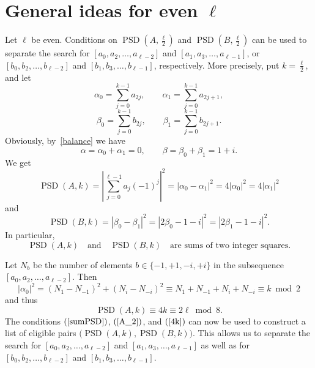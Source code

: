 \documentclass{article}
\theoremstyle{definition}
\newcommand{\PSD}{\operatorname{PSD}}
\begin{document}
\section{General ideas for even \texorpdfstring{$\ell$}{l}}
\label{general}
Let $\ell$ be even. 
Conditions on $\PSD\left(A,\frac{\ell}{2}\right)$ and $\PSD\left(B,\frac{\ell}{2}\right)$ can be used to separate the search for $[a_0,a_2,\ldots,a_{\ell-2}]$ and $[a_1,a_3,\ldots,a_{\ell-1}]$, or $[b_0,b_2,\ldots,b_{\ell-2}]$ and $[b_1,b_3,\ldots,b_{\ell-1}]$, respectively. More precisely, put $k=\frac{\ell}{2}$, and let
\begin{equation}\label{evenodd1}
\alpha_0=\sum_{j=0}^{k-1} a_{2j},\qquad \alpha_1=\sum_{j=0}^{k-1}a_{2j+1},
\end{equation}
\begin{equation}\label{evenodd2}
\beta_0=\sum_{j=0}^{k-1} b_{2j},\qquad \beta_1=\sum_{j=0}^{k-1}b_{2j+1}.
\end{equation}
Obviously, by~\eqref{balance} we have
$$\alpha=\alpha_0+\alpha_1=0,\qquad \beta=\beta_0+\beta_1=1+i.$$
We get
$$%
\PSD(A,k)=\left|\sum_{j=0}^{\ell-1}a_j (-1)^j\right|^2=|\alpha_0-\alpha_1|^2=4|\alpha_0|^2=4|\alpha_1|^2$$
and
$$%
\PSD(B,k)=|\beta_0-\beta_1|^2=|2\beta_0-1-i|^2=|2\beta_1-1-i|^2.$$
In particular, 
\begin{equation}\label{A_2}
 \PSD(A,k) \quad\mbox{and}\quad  \PSD(B,k)\quad \mbox{are sums of two integer squares}. 
\end{equation}

Let $N_b$ be the number of elements $b\in \{-1,+1,-i,+i\}$ in the subsequence $[a_0,a_2,\ldots,a_{\ell-2}]$. 
Then
\begin{equation}\label{alpha0iskmod2}
  |\alpha_0|^2=(N_1-N_{-1})^2+(N_i-N_{-i})^2\equiv N_1+N_{-1}+N_i+N_{-i}\equiv k \bmod 2
\end{equation}
and thus 
\begin{equation}\label{4k}\PSD(A,k)\equiv 4k\equiv 2\ell \bmod 8.
\end{equation}
The conditions $(\ref{sumPSD})$, $(\ref{A_2})$, and $(\ref{4k})$ can now be used to construct a list of eligible pairs $\bigl(\PSD(A,k),\PSD(B,k)\bigr)$. This allows us to
separate the search for $[a_0,a_2,\ldots,a_{\ell-2}]$ and $[a_1,a_3,\ldots,a_{\ell-1}]$ as well as 
for $[b_0,b_2,\ldots,b_{\ell-2}]$ and $[b_1,b_3,\ldots,b_{\ell-1}]$.
\end{document}
